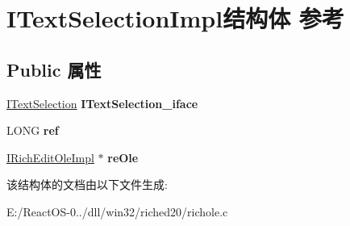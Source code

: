 \hypertarget{struct_i_text_selection_impl}{}\section{I\+Text\+Selection\+Impl结构体 参考}
\label{struct_i_text_selection_impl}
\subsection*{Public 属性}
\begin{DoxyCompactItemize}
\item 
\mbox{\label{struct_i_text_selection_impl_af693aeb510790398aae443c572dcf1ce}} 
\hyperlink{interface_i_text_selection}{I\+Text\+Selection} {\bfseries I\+Text\+Selection\+\_\+iface}
\item 
\mbox{\label{struct_i_text_selection_impl_a7408bed4bb8b9067fc6def54b3045f06}} 
L\+O\+NG {\bfseries ref}
\item 
\mbox{\label{struct_i_text_selection_impl_a45da394e2da637d695a176a9b80ccadc}} 
\hyperlink{struct_i_rich_edit_ole_impl}{I\+Rich\+Edit\+Ole\+Impl} $\ast$ {\bfseries re\+Ole}
\end{DoxyCompactItemize}


该结构体的文档由以下文件生成\+:\begin{DoxyCompactItemize}
\item 
E\+:/\+React\+O\+S-\/0../dll/win32/riched20/richole.\+c\end{DoxyCompactItemize}
